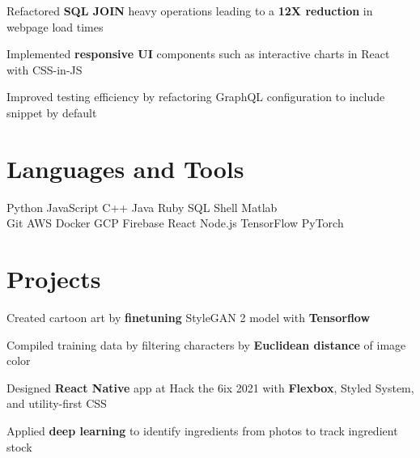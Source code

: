 \documentclass[]{deedy-resume-openfont}
\begin{document}
\begin{tightemize}
\item Refactored \textbf{SQL JOIN} heavy operations leading to a  \textbf{12X reduction} in webpage load times
				\item Implemented \textbf{responsive UI} components such as interactive charts in React with CSS-in-JS
				\item Improved testing efficiency by refactoring GraphQL configuration to include snippet by default
\end{tightemize}
\sectionsep

\section{Languages and Tools}
Python \textbullet{} JavaScript \textbullet{} C++ \textbullet{} Java \textbullet{} Ruby \textbullet{} SQL \textbullet{} Shell \textbullet{} Matlab \\
Git \textbullet{} AWS \textbullet{} Docker \textbullet{} GCP \textbullet{} Firebase \textbullet{} React \textbullet{} Node.js \textbullet{} TensorFlow \textbullet{} PyTorch
\sectionsep


\section{Projects}
\location{}
\begin{tightemize}
				\item Created cartoon art by \textbf{finetuning} StyleGAN 2 model with \textbf{Tensorflow}
				\item Compiled training data by filtering characters by \textbf{Euclidean distance} of image color %
\end{tightemize}
\sectionsep

\location{}
\begin{tightemize}
\item Designed \textbf{React Native} app at Hack the 6ix 2021 with \textbf{Flexbox}, Styled System, and utility-first CSS 
				\item Applied \textbf{deep learning} to identify ingredients from photos to track ingredient stock
\end{tightemize}
\sectionsep
\end{document}
